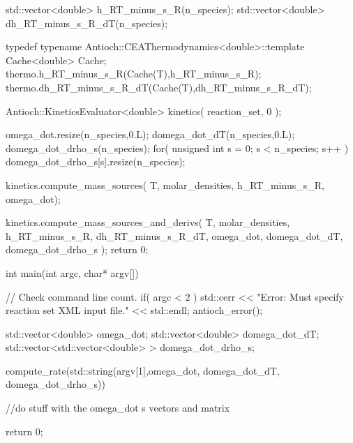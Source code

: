 \begin{cpp}
{  std::vector<double> h_RT_minus_s_R(n_species);
  std::vector<double> dh_RT_minus_s_R_dT(n_species);

  typedef typename Antioch::CEAThermodynamics<double>::template 
                Cache<double> Cache;
  thermo.h_RT_minus_s_R(Cache(T),h_RT_minus_s_R);
  thermo.dh_RT_minus_s_R_dT(Cache(T),dh_RT_minus_s_R_dT);

  Antioch::KineticsEvaluator<double> kinetics( reaction_set, 0 );

  omega_dot.resize(n_species,0.L);
  domega_dot_dT(n_species,0.L);
  domega_dot_drho_s(n_species);
  for( unsigned int s = 0; s < n_species; s++ )
    {
      domega_dot_drho_s[s].resize(n_species);
    }
  
  kinetics.compute_mass_sources( T, molar_densities, 
                                 h_RT_minus_s_R, omega_dot);

  kinetics.compute_mass_sources_and_derivs( T, molar_densities, 
                                            h_RT_minus_s_R, dh_RT_minus_s_R_dT,
                                            omega_dot, domega_dot_dT, 
                                            domega_dot_drho_s );
  return 0;
}

int main(int argc, char* argv[])
{
  // Check command line count.
  if( argc < 2 )
    {
      std::cerr << "Error: Must specify reaction set XML input file." 
                << std::endl;
      antioch_error();
    }

  std::vector<double> omega_dot;
  std::vector<double> domega_dot_dT;
  std::vector<std::vector<double> > domega_dot_drho_s;

  compute_rate(std::string(argv[1],omega_dot,
                                   domega_dot_dT,
                                   domega_dot_drho_s))

  //do stuff with the omega_dot s vectors and matrix

  return 0;
}
\end{cpp}

